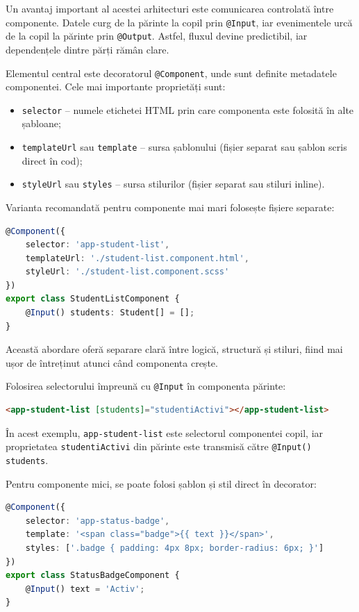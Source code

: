 Un avantaj important al acestei arhitecturi este comunicarea controlată între componente. Datele curg de la părinte la copil prin \texttt{@Input}, iar evenimentele urcă de la copil la părinte prin \texttt{@Output}. Astfel, fluxul devine predictibil, iar dependențele dintre părți rămân clare.

Elementul central este decoratorul \texttt{@Component}, unde sunt definite metadatele componentei. Cele mai importante proprietăți sunt:
\begin{itemize}
	\item \texttt{selector} -- numele etichetei HTML prin care componenta este folosită în alte șabloane;
	\item \texttt{templateUrl} sau \texttt{template} -- sursa șablonului (fișier separat sau șablon scris direct în cod);
	\item \texttt{styleUrl} sau \texttt{styles} -- sursa stilurilor (fișier separat sau stiluri inline).
\end{itemize}

Varianta recomandată pentru componente mai mari folosește fișiere separate:

\begin{lstlisting}[language=TypeScript]
@Component({
	selector: 'app-student-list',
	templateUrl: './student-list.component.html',
	styleUrl: './student-list.component.scss'
})
export class StudentListComponent {
	@Input() students: Student[] = [];
}
\end{lstlisting}

Această abordare oferă separare clară între logică, structură și stiluri, fiind mai ușor de întreținut atunci când componenta crește.

Folosirea selectorului împreună cu \texttt{@Input} în componenta părinte:

\begin{lstlisting}[language=HTML]
<app-student-list [students]="studentiActivi"></app-student-list>
\end{lstlisting}

În acest exemplu, \texttt{app-student-list} este selectorul componentei copil, iar proprietatea \texttt{studentiActivi} din părinte este transmisă către \texttt{@Input() students}.

Pentru componente mici, se poate folosi șablon și stil direct în decorator:

\begin{lstlisting}[language=TypeScript]
@Component({
	selector: 'app-status-badge',
	template: '<span class="badge">{{ text }}</span>',
	styles: ['.badge { padding: 4px 8px; border-radius: 6px; }']
})
export class StatusBadgeComponent {
	@Input() text = 'Activ';
}
\end{lstlisting}

